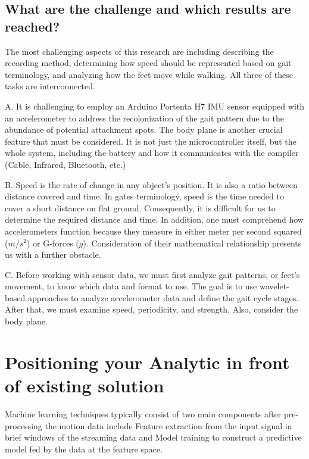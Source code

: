 \subsection{What are the challenge and which results are reached?}

The most challenging aspects of this research are including describing the recording method, determining how speed should be represented based on gait terminology, and analyzing how the feet move while walking. All three of these tasks are interconnected.

\bigskip

A. It is challenging to employ an Arduino Portenta H7 IMU sensor equipped with an accelerometer to address the recolonization of the gait pattern due to the abundance of potential attachment spots. The body plane is another crucial feature that must be considered. It is not just the microcontroller itself, but the whole system, including the battery and how it communicates with the compiler (Cable, Infrared, Bluetooth, etc.)

\bigskip

B. Speed is the rate of change in any object's position. It is also a ratio between distance covered and time. In gates terminology, speed is the time needed to cover a short distance on flat ground. Consequently, it is difficult for us to determine the required distance and time. In addition, one must comprehend how accelerometers function because they measure in either meter per second squared ($m/s^2$) or G-forces ($g$). Consideration of their mathematical relationship presents us with a further obstacle.


\bigskip

C. Before working with sensor data, we must first analyze gait patterns, or feet's movement, to know which data and format to use. The goal is to use wavelet-based approaches to analyze accelerometer data and define the gait cycle stages. After that, we must examine speed, periodicity, and strength. Also, consider the body plane.

\section{Positioning your Analytic in front of existing solution}
\label{chapter:Positioning your Analytic in front of existing solution}

Machine learning techniques typically consist of two main components after pre-processing the motion data include Feature extraction from the input signal in brief windows of the streaming data and Model training to construct a predictive model fed by the data at the feature space.

